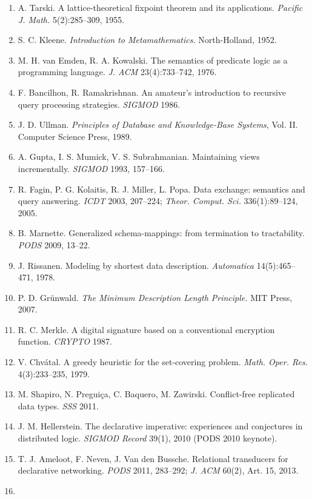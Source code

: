 \documentclass[
  10pt,
]{article}
\providecommand{\tightlist}{%
  \setlength{\itemsep}{0pt}\setlength{\parskip}{0pt}}
\begin{document}
\begin{enumerate}
\def\labelenumi{\arabic{enumi}.}
\tightlist
\item
  A. Tarski. A lattice-theoretical fixpoint theorem and its
  applications. \emph{Pacific J. Math.} 5(2):285--309, 1955.
\item
  S. C. Kleene. \emph{Introduction to Metamathematics.} North-Holland,
  1952.
\item
  M. H. van Emden, R. A. Kowalski. The semantics of predicate logic as a
  programming language. \emph{J. ACM} 23(4):733--742, 1976.
\item
  F. Bancilhon, R. Ramakrishnan. An amateur's introduction to recursive
  query processing strategies. \emph{SIGMOD} 1986.
\item
  J. D. Ullman. \emph{Principles of Database and Knowledge-Base
  Systems}, Vol. II. Computer Science Press, 1989.
\item
  A. Gupta, I. S. Mumick, V. S. Subrahmanian. Maintaining views
  incrementally. \emph{SIGMOD} 1993, 157--166.
\item
  R. Fagin, P. G. Kolaitis, R. J. Miller, L. Popa. Data exchange:
  semantics and query answering. \emph{ICDT} 2003, 207--224;
  \emph{Theor. Comput. Sci.} 336(1):89--124, 2005.
\item
  B. Marnette. Generalized schema-mappings: from termination to
  tractability. \emph{PODS} 2009, 13--22.
\item
  J. Rissanen. Modeling by shortest data description. \emph{Automatica}
  14(5):465--471, 1978.
\item
  P. D. Grünwald. \emph{The Minimum Description Length Principle.} MIT
  Press, 2007.
\item
  R. C. Merkle. A digital signature based on a conventional encryption
  function. \emph{CRYPTO} 1987.
\item
  V. Chvátal. A greedy heuristic for the set-covering problem.
  \emph{Math. Oper. Res.} 4(3):233--235, 1979.
\item
  M. Shapiro, N. Preguiça, C. Baquero, M. Zawirski. Conflict-free
  replicated data types. \emph{SSS} 2011.
\item
  J. M. Hellerstein. The declarative imperative: experiences and
  conjectures in distributed logic. \emph{SIGMOD Record} 39(1), 2010
  (PODS 2010 keynote).
\item
  T. J. Ameloot, F. Neven, J. Van den Bussche. Relational transducers
  for declarative networking. \emph{PODS} 2011, 283--292; \emph{J. ACM}
  60(2), Art. 15, 2013.
\item

\end{enumerate}
\end{document}
